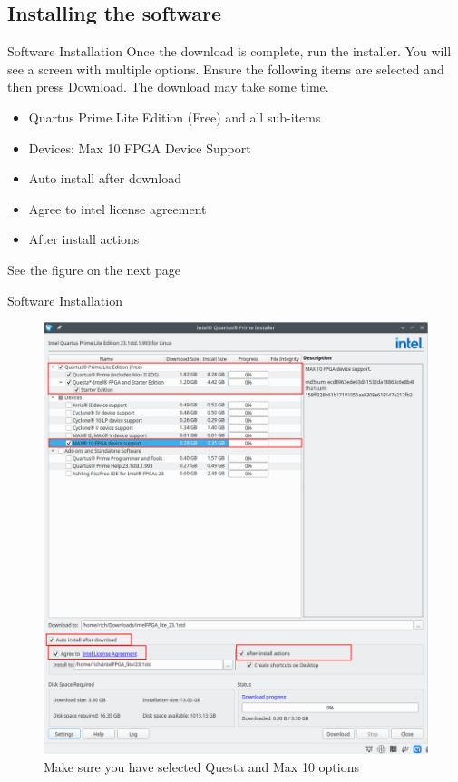 \documentclass[fleqn]{beamer}
\begin{document}
\subsection{Installing the software}
\begin{frame}{Software Installation}
    Once the download is complete, run the installer. You will see a screen with multiple options. Ensure the following items are selected and then press Download. The download may take some time.
    \begin{itemize}
        \item Quartus Prime Lite Edition (Free) and all sub-items
        \item Devices: Max 10 FPGA Device Support
        \item Auto install after download
        \item Agree to intel license agreement
        \item After install actions
    \end{itemize}
    See the figure on the next page
\end{frame}
\begin{frame}{Software Installation}
        \begin{figure}
        \centering
        \includegraphics[width=\textwidth,height=\textheight,keepaspectratio]{setup_guide//figures/installer_1.png}
        \caption{Make sure you have selected Questa and Max 10 options}
        \label{fig:enter-label}
    \end{figure}
\end{frame}
\end{document}
